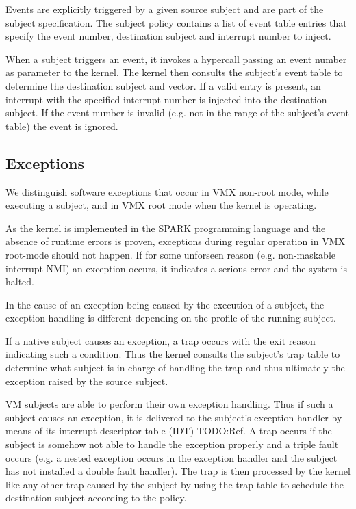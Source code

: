 Events are explicitly triggered by a given source subject and are part of the
subject specification. The subject policy contains a list of event table entries
that specify the event number, destination subject and interrupt number to
inject.

When a subject triggers an event, it invokes a hypercall passing an event number
as parameter to the kernel. The kernel then consults the subject's event table
to determine the destination subject and vector. If a valid entry is present, an
interrupt with the specified interrupt number is injected into the destination
subject. If the event number is invalid (e.g. not in the range of the subject's
event table) the event is ignored.

\subsection{Exceptions}
We distinguish software exceptions that occur in VMX non-root mode, while
executing a subject, and in VMX root mode when the kernel is operating.

As the kernel is implemented in the SPARK programming language and the absence
of runtime errors is proven, exceptions during regular operation in VMX
root-mode should not happen. If for some unforseen reason (e.g. non-maskable
interrupt NMI) an exception occurs, it indicates a serious error and the system
is halted.

In the cause of an exception being caused by the execution of a subject, the
exception handling is different depending on the profile of the running subject.

If a native subject causes an exception, a trap occurs with the exit reason
indicating such a condition. Thus the kernel consults the subject's trap table
to determine what subject is in charge of handling the trap and thus ultimately
the exception raised by the source subject.

VM subjects are able to perform their own exception handling. Thus if such a
subject causes an exception, it is delivered to the subject's exception handler
by means of its interrupt descriptor table (IDT) TODO:Ref. A trap occurs if the
subject is somehow not able to handle the exception properly and a triple fault
occurs (e.g. a nested exception occurs in the exception handler and the subject
has not installed a double fault handler).
The trap is then processed by the kernel like any other trap caused by the
subject by using the trap table to schedule the destination subject according to
the policy.

